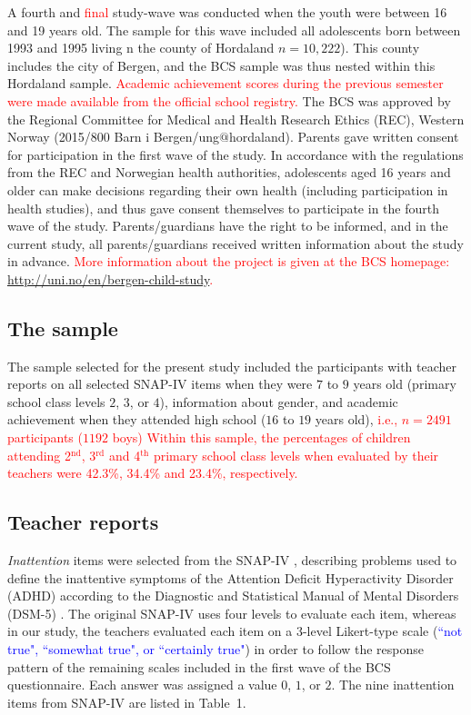 \documentclass[10pt,letterpaper]{article}
\begin{document}
A fourth and \textcolor{red} {final} study-wave was conducted when the youth were between 16 and 19 years old. The sample for this wave included all adolescents born between 1993 and 1995 living n the county of Hordaland $n=10,222$). This county includes the city of Bergen, and the BCS sample was thus nested within this Hordaland sample. \textcolor{red} { Academic achievement scores  during the previous semester were made available from the official school registry.}  The BCS was approved by the Regional Committee for Medical and Health Research Ethics (REC), Western Norway (2015/800 Barn i Bergen/ung$@$hordaland). Parents gave written consent for participation in the first wave of the study. In accordance with the regulations from the REC and Norwegian health authorities, adolescents aged 16 years and older can make decisions regarding their own health (including participation in health studies), and thus gave consent themselves to participate in the fourth wave of the study. Parents/guardians have the right to be informed, and in the current study, all parents/guardians received written information about the study in advance.
\textcolor{red}{More information about the project is given at the BCS homepage: {\small \url{http://uni.no/en/bergen-child-study}}.}

\vspace{3mm}
\subsection*{The sample}
The sample selected for the present study included the participants with teacher reports on all selected SNAP-IV items when they were $7$ to $9$ years old (primary school class levels $2$, $3$, or $4$), information about gender, and academic achievement when they attended high school ($16$ to $19$ years old), \textcolor{red}{i.e., $n=2491$ participants ($1192$ boys)}
\textcolor{red}{Within this sample, the percentages of children attending 2$^{\text{nd}}$, 3$^{\text{rd}}$ and 4$^{\text{th}}$ primary school
 class levels when evaluated by their teachers were 
\textcolor{red}{42.3\%, 34.4\% and 23.4\%}, respectively.}

\vspace{3mm}
\subsection*{Teacher reports}
\emph{Inattention} items were selected from the SNAP-IV \cite{Swanson1992}, describing problems used to define the inattentive symptoms of the Attention Deficit Hyperactivity Disorder (ADHD) according to the Diagnostic and Statistical Manual of Mental Disorders (DSM-5) \cite{APA2013}. The original SNAP-IV uses four levels to evaluate each item, whereas in our study, the teachers evaluated each item on a 3-level Likert-type scale (\textcolor{blue}{``not true", ``somewhat true", or ``certainly true"}) in order to follow the response pattern of the remaining scales included in the first wave of the BCS questionnaire. Each answer was assigned a value $0$, $1$, or $2$. 
The  nine inattention items from SNAP-IV are listed in Table~1. 
\end{document}
